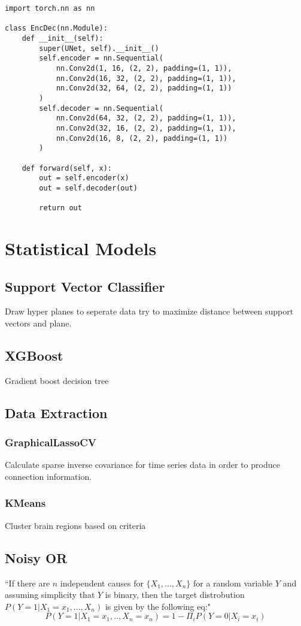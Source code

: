 \documentclass[11pt]{article}
\begin{document}
\begin{verbatim}
import torch.nn as nn

class EncDec(nn.Module):
    def __init__(self):
        super(UNet, self).__init__()
        self.encoder = nn.Sequential(
            nn.Conv2d(1, 16, (2, 2), padding=(1, 1)),
            nn.Conv2d(16, 32, (2, 2), padding=(1, 1)),
            nn.Conv2d(32, 64, (2, 2), padding=(1, 1))
        )
        self.decoder = nn.Sequential(
            nn.Conv2d(64, 32, (2, 2), padding=(1, 1)),
            nn.Conv2d(32, 16, (2, 2), padding=(1, 1)),
            nn.Conv2d(16, 8, (2, 2), padding=(1, 1))
        )

    def forward(self, x):
        out = self.encoder(x)
        out = self.decoder(out)

        return out
\end{verbatim}

\section{Statistical Models}

\subsection{Support Vector Classifier}

Draw hyper planes to seperate data try to
maximize distance between support vectors and plane.

\subsection{XGBoost}

Gradient boost decision tree

\subsection{Data Extraction}

\subsubsection{GraphicalLassoCV}

Calculate sparse inverse covariance for time series data in order to produce connection information.

\subsubsection{KMeans}

Cluster brain regions based on criteria

\subsection{Noisy OR}
``If there are $n$ independent causes for $\{X_1,...,X_n\}$ for a random variable $Y$ and assuming simplicity that $Y$ is binary, then the target distrobution $P(Y=1 | X_1 = x_1,...,X_n)$ is given by the following eq:" \cite{y2013}
$$
P(Y=1 | X_1 = x_1,..,X_n = x_n) = 1 - \Pi_{i} P(Y = 0 | X_i = x_i)
$$

{}

\end{document}
